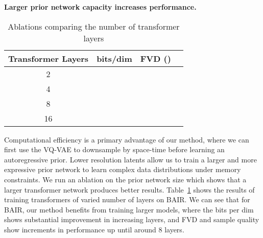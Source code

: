 \textbf{Larger prior network capacity increases performance.}
\begin{table}[H]
        \centering
        \caption{Ablations comparing the number of transformer layers}
\label{table:abl_tfm_layers}
\begin{tabular}{@{}cccc@{}}
\toprule
Transformer Layers & bits/dim & FVD ()  \\ \midrule
2                  &    &       \\
4                  &    &        \\
8                  &    &        \\
16                 &    &        \\ \bottomrule
\end{tabular}
\end{table}
Computational efficiency is a primary advantage of our method, where we can first use the VQ-VAE to downsample by space-time before learning an autoregressive prior. Lower resolution latents allow us to train a larger and more expressive prior network to learn complex data distributions under memory constraints. We run an ablation on the prior network size which shows that a larger transformer network produces better results. Table~\ref{table:abl_tfm_layers} shows the results of training transformers of varied number of layers on BAIR. We can see that for BAIR, our method benefits from training larger models, where the bits per dim shows substantial improvement in increasing layers, and FVD and sample quality show increments in performance up until around 8 layers. 

